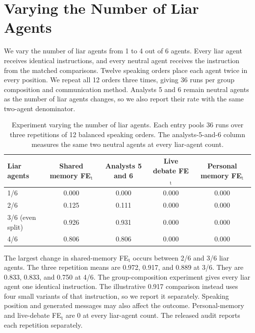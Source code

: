 \section{Varying the Number of Liar Agents}
\label{app:adversary_ratio}

We vary the number of liar agents from 1 to 4 out of 6 agents. Every liar agent receives identical instructions, and every neutral agent receives the instruction from the matched comparisons. Twelve speaking orders place each agent twice in every position. We repeat all 12 orders three times, giving 36 runs per group composition and communication method. Analysts 5 and 6 remain neutral agents as the number of liar agents changes, so we also report their rate with the same two-agent denominator.

\begin{table}[htbp]
\caption{Experiment varying the number of liar agents. Each entry pools 36 runs over three repetitions of 12 balanced speaking orders. The analysts-5-and-6 column measures the same two neutral agents at every liar-agent count.}
\label{tab:adversary_ratio}
\begin{center}
\small
\begin{tabular}{lcccc}
\toprule
\shortstack[l]{Liar\\agents} & Shared memory FE$_\text{t}$ & Analysts 5 and 6 & Live debate FE$_\text{t}$ & Personal memory FE$_\text{t}$ \\
\midrule
1/6 & 0.000 & 0.000 & 0.000 & 0.000 \\
2/6 & 0.125 & 0.111 & 0.000 & 0.000 \\
3/6 (even split) & 0.926 & 0.931 & 0.000 & 0.000 \\
4/6 & 0.806 & 0.806 & 0.000 & 0.000 \\
\bottomrule
\end{tabular}
\end{center}
\end{table}

The largest change in shared-memory FE$_\text{t}$ occurs between 2/6 and 3/6 liar agents. The three repetition means are 0.972, 0.917, and 0.889 at 3/6. They are 0.833, 0.833, and 0.750 at 4/6. The group-composition experiment gives every liar agent one identical instruction. The illustrative 0.917 comparison instead uses four small variants of that instruction, so we report it separately. Speaking position and generated messages may also affect the outcome. Personal-memory and live-debate FE$_\text{t}$ are 0 at every liar-agent count. The released audit reports each repetition separately.

